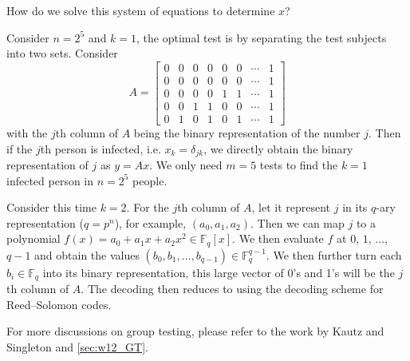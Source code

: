 How do we solve this system of equations to determine $x$?
\begin{example}
    Consider $n=2^5$ and $k=1$, the optimal test is by separating the test subjects into two sets. Consider
    \begin{equation*}
        A = \left[\begin{matrix}
            0 & 0 & 0 & 0 & 0 & 0 & \cdots & 1 \\
            0 & 0 & 0 & 0 & 0 & 0 & \cdots & 1 \\
            0 & 0 & 0 & 0 & 1 & 1 & \cdots & 1 \\
            0 & 0 & 1 & 1 & 0 & 0 & \cdots & 1 \\
            0 & 1 & 0 & 1 & 0 & 1 & \cdots & 1 
        \end{matrix}\right]
    \end{equation*}
    with the $j$th column of $A$ being the binary representation of the number $j$. Then if the $j$th person is infected, i.e. $x_k = \delta_{jk}$, we directly obtain the binary representation of $j$ as $y=Ax$. We only need $m=5$ tests to find the $k=1$ infected person in $n=2^5$ people.
\end{example}

\begin{example}
    \color{red}
    Consider this time $k=2$. For the $j$th column of $A$, let it represent $j$ in its $q$-ary representation ($q=p^n$), for example, $(a_0,a_1,a_2)$. Then we can map $j$ to a polynomial $f(x) = a_0 + a_1x + a_2x^2\in\mathbb{F}_q[x]$. We then evaluate $f$ at $0$, $1$, $\ldots$, $q-1$ and obtain the values $(b_0,b_1,\ldots,b_{q-1})\in\mathbb{F}_q^{q-1}$. We then further turn each $b_i\in\mathbb{F}_q$ into its binary representation, this large vector of 0's and 1's will be the $j$th column of $A$. The decoding then reduces to using the decoding scheme for Reed--Solomon codes.
\end{example}




For more discussions on group testing, please refer to the work by Kautz and Singleton \cite{Kautz_Singleton_64} and \autoref{sec:w12_GT}.